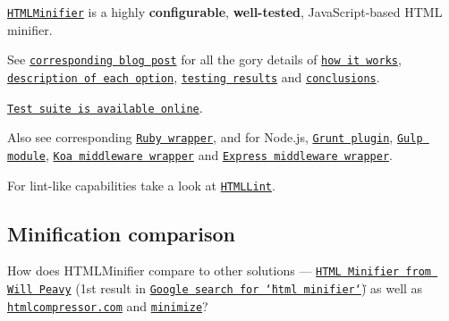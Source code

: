 \href{https://www.npmjs.com/package/html-minifier}{\tt } \href{https://travis-ci.org/kangax/html-minifier}{\tt } \href{https://david-dm.org/kangax/html-minifier}{\tt } \href{https://david-dm.org/kangax/html-minifier?type=dev}{\tt } \href{https://gitter.im/kangax/html-minifier}{\tt }

\href{http://kangax.github.io/html-minifier/}{\tt H\+T\+M\+L\+Minifier} is a highly {\bfseries configurable}, {\bfseries well-\/tested}, Java\+Script-\/based H\+T\+ML minifier.

See \href{http://perfectionkills.com/experimenting-with-html-minifier/}{\tt corresponding blog post} for all the gory details of \href{http://perfectionkills.com/experimenting-with-html-minifier/#how_it_works}{\tt how it works}, \href{http://perfectionkills.com/experimenting-with-html-minifier/#options}{\tt description of each option}, \href{http://perfectionkills.com/experimenting-with-html-minifier/#field_testing}{\tt testing results} and \href{http://perfectionkills.com/experimenting-with-html-minifier/#cost_and_benefits}{\tt conclusions}.

\href{http://kangax.github.io/html-minifier/tests/}{\tt Test suite is available online}.

Also see corresponding \href{https://github.com/stereobooster/html_minifier}{\tt Ruby wrapper}, and for Node.\+js, \href{https://github.com/gruntjs/grunt-contrib-htmlmin}{\tt Grunt plugin}, \href{https://github.com/jonschlinkert/gulp-htmlmin}{\tt Gulp module}, \href{https://github.com/koajs/html-minifier}{\tt Koa middleware wrapper} and \href{https://github.com/melonmanchan/express-minify-html}{\tt Express middleware wrapper}.

For lint-\/like capabilities take a look at \href{https://github.com/kangax/html-lint}{\tt H\+T\+M\+L\+Lint}.

\subsection*{Minification comparison}

How does H\+T\+M\+L\+Minifier compare to other solutions — \href{http://www.willpeavy.com/minifier/}{\tt H\+T\+ML Minifier from Will Peavy} (1st result in \href{https://www.google.com/#q=html+minifier}{\tt Google search for \char`\"{}html minifier\char`\"{}}) as well as \href{http://htmlcompressor.com}{\tt htmlcompressor.\+com} and \href{https://github.com/Swaagie/minimize}{\tt minimize}?

